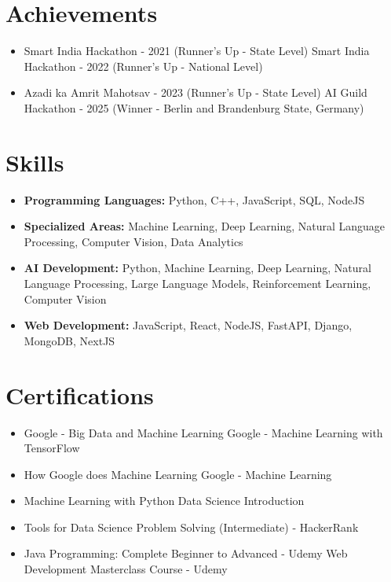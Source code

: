 \documentclass[a4paper,10pt]{article}
\begin{document}
\section*{Achievements}
\begin{itemize}
\item Smart India Hackathon - 2021 (Runner's Up - State Level) \hfill Smart India Hackathon - 2022 (Runner's Up - National Level)
\item Azadi ka Amrit Mahotsav - 2023 (Runner's Up - State Level) \hfill AI Guild Hackathon - 2025 (Winner - Berlin and Brandenburg State, Germany)
\end{itemize}

\section*{Skills}
\begin{itemize}
  \item \textbf{Programming Languages:} Python, C++, JavaScript, SQL, NodeJS
  \item \textbf{Specialized Areas:} Machine Learning, Deep Learning, Natural Language Processing, Computer Vision, Data Analytics
  \item \textbf{AI Development:} Python, Machine Learning, Deep Learning, Natural Language Processing, Large Language Models, Reinforcement Learning, Computer Vision
  \item \textbf{Web Development:} JavaScript, React, NodeJS, FastAPI, Django, MongoDB, NextJS
\end{itemize}

\section*{Certifications}
\begin{itemize}
\item Google - Big Data and Machine Learning \hfill Google - Machine Learning with TensorFlow
\item How Google does Machine Learning \hfill Google - Machine Learning
\item Machine Learning with Python \hfill Data Science Introduction
\item Tools for Data Science \hfill Problem Solving (Intermediate) - HackerRank
\item Java Programming: Complete Beginner to Advanced - Udemy \hfill Web Development Masterclass Course - Udemy
\end{itemize}
\end{document}
